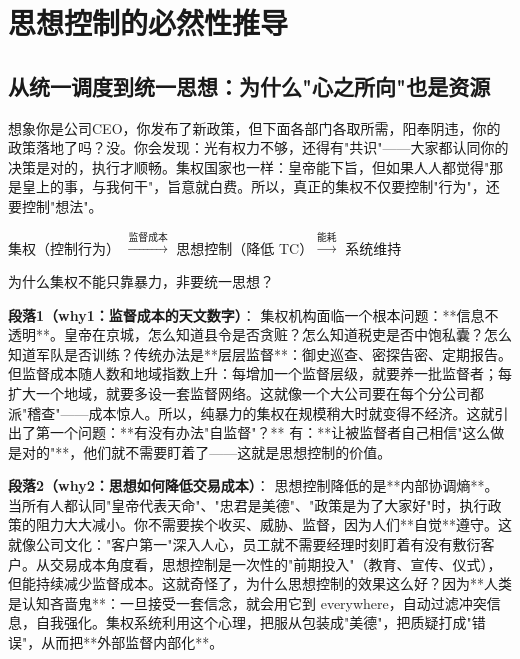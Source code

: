 \documentclass[openany, a4paper, 12pt]{book}
\newenvironment{logicmap}{
	\begin{tcolorbox}[
		colback=blue!5!white,      %
		colframe=blue!50!black,    %
		title=\textbf{逻辑地图 (Logic Map)}, %
		fonttitle=\bfseries,
		sharp corners=south,       %
		boxrule=0.5mm
		]
	\centering
	}{
	\end{tcolorbox}
}
\newenvironment{motivation}{
	\vspace{0.5em}
	\begin{tcolorbox}[
		colback=gray!10,           %
		colframe=gray!60,          %
		title=\textit{本章动机 (Motivation)},
		fonttitle=\bfseries,
		arc=0mm,                   %
		leftrule=3mm               %
		]
		\small \itshape %
	}{
	\end{tcolorbox}
	\vspace{1em}
}
\begin{document}
	\section{思想控制的必然性推导}
	
	\subsection{从统一调度到统一思想：为什么"心之所向"也是资源}
	
	\begin{motivation}
		想象你是公司CEO，你发布了新政策，但下面各部门各取所需，阳奉阴违，你的政策落地了吗？没。你会发现：光有权力不够，还得有"共识"——大家都认同你的决策是对的，执行才顺畅。集权国家也一样：皇帝能下旨，但如果人人都觉得"那是皇上的事，与我何干"，旨意就白费。所以，真正的集权不仅要控制"行为"，还要控制"想法"。
	\end{motivation}
	
	\begin{logicmap}
		集权（控制行为） $\xrightarrow{\text{监督成本}}$ 思想控制（降低 TC）$\xrightarrow{\text{能耗}}$ 系统维持
	\end{logicmap}
	
	\begin{questionbox}
		为什么集权不能只靠暴力，非要统一思想？
	\end{questionbox}
	
	\textbf{段落1（why1：监督成本的天文数字）}：  
	集权机构面临一个根本问题：**信息不透明**。皇帝在京城，怎么知道县令是否贪赃？怎么知道税吏是否中饱私囊？怎么知道军队是否训练？传统办法是**层层监督**：御史巡查、密探告密、定期报告。但监督成本随人数和地域指数上升：每增加一个监督层级，就要养一批监督者；每扩大一个地域，就要多设一套监督网络。这就像一个大公司要在每个分公司都派"稽查"——成本惊人。所以，纯暴力的集权在规模稍大时就变得不经济。这就引出了第一个问题：**有没有办法"自监督"？** 有：**让被监督者自己相信"这么做是对的"**，他们就不需要盯着了——这就是思想控制的价值。
	
	\textbf{段落2（why2：思想如何降低交易成本）}：  
	思想控制降低的是**内部协调熵**。当所有人都认同"皇帝代表天命"、"忠君是美德"、"政策是为了大家好"时，执行政策的阻力大大减小。你不需要挨个收买、威胁、监督，因为人们**自觉**遵守。这就像公司文化："客户第一"深入人心，员工就不需要经理时刻盯着有没有敷衍客户。从交易成本角度看，思想控制是一次性的"前期投入"（教育、宣传、仪式），但能持续减少监督成本。这就奇怪了，为什么思想控制的效果这么好？因为**人类是认知吝啬鬼**：一旦接受一套信念，就会用它到 everywhere，自动过滤冲突信息，自我强化。集权系统利用这个心理，把服从包装成"美德"，把质疑打成"错误"，从而把**外部监督内部化**。
	
\end{document}
